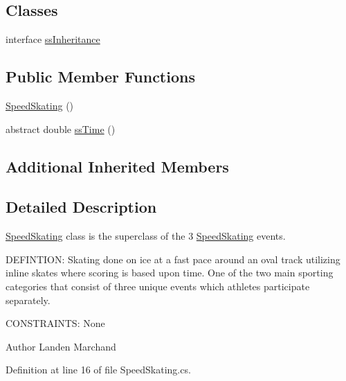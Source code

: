 \subsection*{Classes}
\begin{DoxyCompactItemize}
\item 
interface \hyperlink{interfacePCO_1_1SpeedSkating_1_1ssInheritance}{ss\+Inheritance}
\end{DoxyCompactItemize}
\subsection*{Public Member Functions}
\begin{DoxyCompactItemize}
\item 
\hyperlink{classPCO_1_1SpeedSkating_ae34dc14b71519b97d8eb3c59b6ec4dfe}{Speed\+Skating} ()
\item 
abstract double \hyperlink{classPCO_1_1SpeedSkating_a3bc4e4731f04b9ef3d260197ad847117}{ss\+Time} ()
\end{DoxyCompactItemize}
\subsection*{Additional Inherited Members}


\subsection{Detailed Description}
\hyperlink{classPCO_1_1SpeedSkating}{Speed\+Skating} class is the superclass of the 3 \hyperlink{classPCO_1_1SpeedSkating}{Speed\+Skating} events. 

D\+E\+F\+I\+N\+T\+I\+O\+N\+: Skating done on ice at a fast pace around an oval track utilizing inline skates where scoring is based upon time. One of the two main sporting categories that consist of three unique events which athletes participate separately.

C\+O\+N\+S\+T\+R\+A\+I\+N\+T\+S\+: None\begin{DoxyAuthor}{Author}
Landen Marchand 
\end{DoxyAuthor}


Definition at line 16 of file Speed\+Skating.\+cs.



